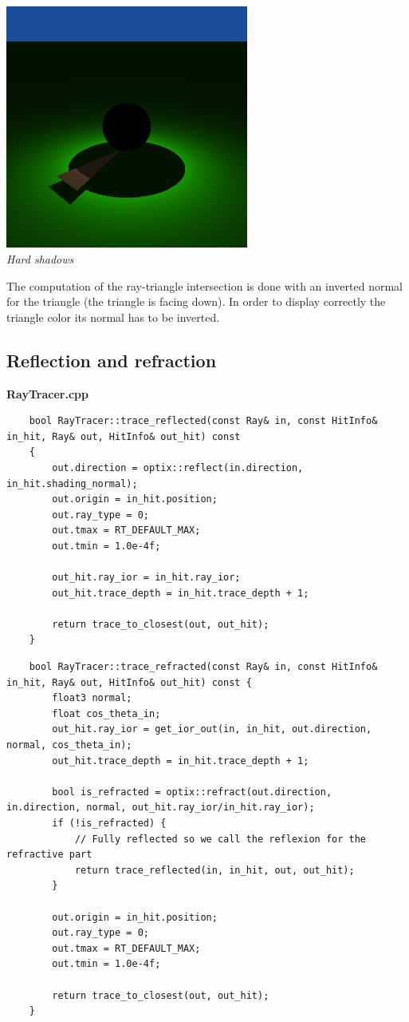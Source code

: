 \documentclass[a4,12pt]{article}
\begin{document}
	\begin{center}
		\includegraphics[width =8cm]{./Worksheet2/hard_shadows.png}\\
		\textit{Hard shadows}
	\end{center}
	
	The computation of the ray-triangle intersection is done with an inverted normal for the triangle (the triangle is facing down). In order to display correctly the triangle color its normal has to be inverted.
	
	\subsection{Reflection and refraction}
	\textbf{RayTracer.cpp}
	\begin{lstlisting}
	bool RayTracer::trace_reflected(const Ray& in, const HitInfo& in_hit, Ray& out, HitInfo& out_hit) const
	{
		out.direction = optix::reflect(in.direction, in_hit.shading_normal);
		out.origin = in_hit.position;
		out.ray_type = 0;
		out.tmax = RT_DEFAULT_MAX;
		out.tmin = 1.0e-4f;
		
		out_hit.ray_ior = in_hit.ray_ior;
		out_hit.trace_depth = in_hit.trace_depth + 1;
		
		return trace_to_closest(out, out_hit);
	}
	\end{lstlisting}
	
	\begin{lstlisting}
	bool RayTracer::trace_refracted(const Ray& in, const HitInfo& in_hit, Ray& out, HitInfo& out_hit) const {
		float3 normal;
		float cos_theta_in;
		out_hit.ray_ior = get_ior_out(in, in_hit, out.direction, normal, cos_theta_in);
		out_hit.trace_depth = in_hit.trace_depth + 1;
		
		bool is_refracted = optix::refract(out.direction, in.direction, normal, out_hit.ray_ior/in_hit.ray_ior);
		if (!is_refracted) {
			// Fully reflected so we call the reflexion for the refractive part
			return trace_reflected(in, in_hit, out, out_hit);
		}
		
		out.origin = in_hit.position;
		out.ray_type = 0;
		out.tmax = RT_DEFAULT_MAX;
		out.tmin = 1.0e-4f;
		
		return trace_to_closest(out, out_hit);
	}
	\end{lstlisting}
	
\end{document}
